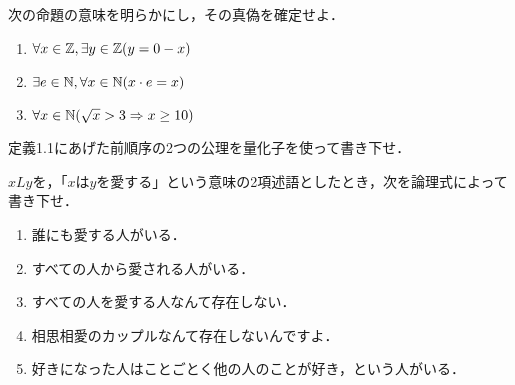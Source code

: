 \documentclass[11pt,a4paper]{jsarticle}
\begin{document}
\begin{exercise}
 次の命題の意味を明らかにし，その真偽を確定せよ．
\begin{enumerate}
 \item $\forall x \in \mathbb{Z}, \exists y \in \mathbb{Z} (y = 0 - x)$
 \item $\exists e \in \mathbb{N}, \forall x \in \mathbb{N} (x \cdot e = x)$
 \item $\forall x \in \mathbb{N} (\sqrt{x} > 3 \Rightarrow x \geq 10)$
\end{enumerate}
\end{exercise}

\begin{exercise}
 定義1.1にあげた前順序の2つの公理を量化子を使って書き下せ．
\end{exercise}





\begin{exercise}
 $xLy$を，「$x$は$y$を愛する」という意味の2項述語としたとき，次を論理式によって書き下せ．
\begin{enumerate}
 \item 誰にも愛する人がいる．
 \item すべての人から愛される人がいる．
 \item すべての人を愛する人なんて存在しない．
 \item 相思相愛のカップルなんて存在しないんですよ．
 \item 好きになった人はことごとく他の人のことが好き，という人がいる．
\end{enumerate}

\end{exercise}
\end{document}
